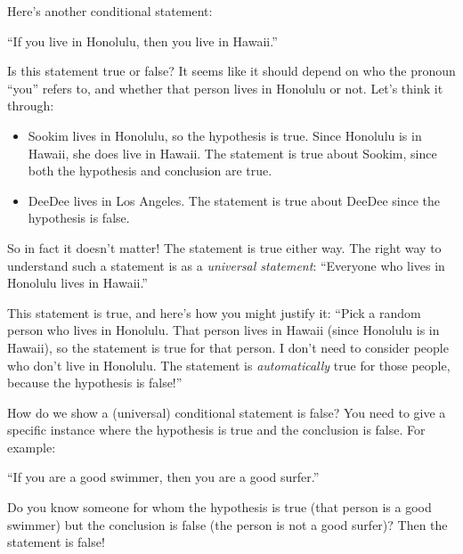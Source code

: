 \begin{example}
Here's another conditional statement:
\begin{center}
``If you live in Honolulu, then you live in Hawaii.''
\end{center}
Is this statement true or false?  It seems like it should depend on who the pronoun ``you'' refers to, and whether that person lives in Honolulu or not.  Let's think it through:
\begin{itemize}
\item
Sookim lives in Honolulu, so the hypothesis is true.  Since Honolulu is in Hawaii, she does live in Hawaii.  The statement is true about Sookim, since both the hypothesis and conclusion are true.
\item
DeeDee lives in Los Angeles.  The statement is true about DeeDee since the hypothesis is false.
\end{itemize} 

So in fact it doesn't matter!  The statement is true either way.  The right way to understand such a statement is as a \emph{universal statement}: ``Everyone who lives in Honolulu lives in Hawaii.''  

This statement is true, and here's how you might justify it:  ``Pick a random person who lives in Honolulu.  That person lives in Hawaii (since Honolulu is in Hawaii), so the statement is true for that person.  I don't need to consider people who don't live in Honolulu.  The statement is \emph{automatically} true for those people, because the hypothesis is false!''
\end{example}

\begin{example}
How do we show a (universal) conditional statement is false?  You need to give a specific instance where the hypothesis is true and the conclusion is false.  For example:
\begin{center}
``If you are a good swimmer, then you are a good surfer.''
\end{center}
Do you know someone for whom the hypothesis is true (that person is a good swimmer) but the conclusion is false (the person is not a good surfer)?  Then the statement is false!
\end{example}

